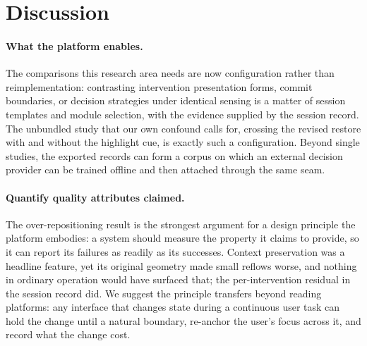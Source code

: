 \section{Discussion}
\label{sec:discussion}

\paragraph{What the platform enables.}
The comparisons this research area needs are now configuration rather than reimplementation: contrasting intervention presentation forms, commit boundaries, or decision strategies under identical sensing is a matter of session templates and module selection, with the evidence supplied by the session record.
The unbundled study that our own confound calls for, crossing the revised restore with and without the highlight cue, is exactly such a configuration.
Beyond single studies, the exported records can form a corpus on which an external decision provider can be trained offline and then attached through the same seam. %

\paragraph{Quantify quality attributes claimed.}
The over-repositioning result is the strongest argument for a design principle the platform embodies: a system should measure the property it claims to provide, so it can report its failures as readily as its successes.
Context preservation was a headline feature, yet its original geometry made small reflows worse, and nothing in ordinary operation would have surfaced that; the per-intervention residual in the session record did.
We suggest the principle transfers beyond reading platforms: any interface that changes state during a continuous user task can hold the change until a natural boundary, re-anchor the user's focus across it, and record what the change cost.

